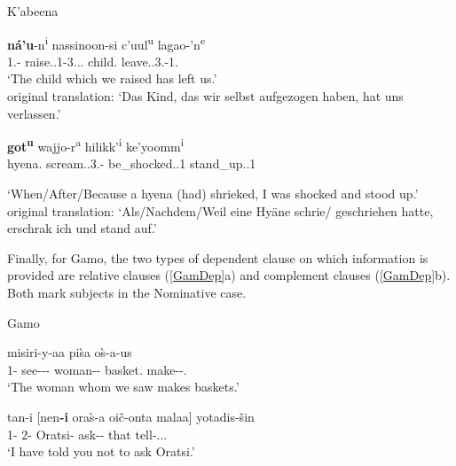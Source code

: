 \begin{exe}\ex\label{KabDep} {K'abeena} \citep[Eastern Cushitic; Ethiopia; ][287]{Crass:2005}\nopagebreak[4]
\begin{xlist}
\ex\gll \textbf{n\'a'u}-n\textsuperscript{i} nassinoon-si c'uul\textsuperscript{u} lagao-'n\textsuperscript{e}\\
1\pl{}.\nom{}-\emphat{} raise.\pfv{}.1\pl{}-3\sg{}.\mas{}.\obj{}.\relativ{} child.\nom{} leave.\pfv{}.3\sg{}.\mas{}-1\pl{}.\obj{}\\
`The child which we raised has left us.'\\
original translation: `Das Kind, das wir selbst aufgezogen haben, hat uns verlassen.' %

\ex\gll \textbf{got\textsuperscript{u}} wajjo-r\textsuperscript{a} hilikk'\textsuperscript{i} ke'yoomm\textsuperscript{i}\\
hyena.\nom{} scream.\pfv{}.3\sg{}.\mas{}-\tmp{} be\_shocked.\cvb{}.1\sg{} stand\_up.\pfv{}.1\sg{}\\
\begin{sloppypar} `When/After/Because a hyena (had) shrieked, I was shocked and stood up.' %
\\
original translation: `Als/Nachdem/Weil eine Hy\"{a}ne schrie/ ge\-schrie\-hen hatte, erschrak ich und stand auf.' \end{sloppypar} %
\end{xlist}
\end{exe}

Finally, for Gamo, the two types of dependent clause on which information is provided are relative clauses (\ref{GamDep}a) and complement clauses (\ref{GamDep}b). 
Both mark subjects in the Nominative  case.

\pagebreak
\begin{exe}\ex\label{GamDep} {Gamo} \citep[Omotic; Ethiopia; ][400, 361]{Hompo:1990}\nopagebreak[4]
\begin{xlist}
\ex{} misiri-y-aa pi\`sa o\`s-a-us\\
1\pl{}-\nom{} see-\persm-\tns{}-\complx{} woman--\nom{} basket.\acc{} make-\persm-\tns{}.\complx{}\\
`The woman whom we saw makes baskets.'

\ex\gll tan-i [nen\textbf{-i} ora\`s-a oi\v c-onta malaa] yotadis-\v sin\\
1\sg{}-\nom{} 2\sg{}-\nom{} Oratsi-\acc{} ask-\Neg{}-\Inf{} that tell-\persm.\tns{}.\complx{}.\aux{}\\
`I have told you not to ask Oratsi.'
\end{xlist}
\end{exe}


